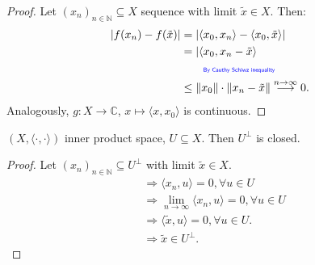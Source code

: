 \documentclass[../../note.tex]{subfiles}
\begin{document}
\begin{example}
\begin{itemize}
        \begin{proof}
            Let $(x_n)_{n \in \mathbb{N}} \subseteq X$ sequence with limit $\tilde{x} \in X$. Then:
            \begin{align}
                \vert f(x_n) -f(\tilde{x}) \vert 
                &= \vert \langle x_0, x_n \rangle - \langle x_0, \tilde{x} \rangle \vert \\
                &= \vert \langle x_0, x_n - \tilde{x} \rangle \\
                &\qquad\text{\color{blue}{\tiny\sffamily By Cauthy Schiwz inequality}} \nonumber \\
                &\leq \Vert x_0 \Vert \cdot \Vert x_n - \tilde{x} \Vert \stackrel{n \rightarrow \infty}{\longrightarrow} 0.
            \end{align}
            Analogously, $g: X \rightarrow \mathbb{C}$, $x \mapsto \langle x, x_0 \rangle$ is continuous.
        \end{proof}
    \end{itemize}
\end{example}

\begin{lemma}
    $(X, \langle \cdot, \cdot \rangle)$ inner product space, $U \subseteq X$. Then $U^\bot$ is closed.
\end{lemma}
\begin{proof}
    Let $(x_n)_{n \in \mathbb{N}} \subseteq U^\bot$ with limit $\tilde{x} \in X$. 
    \begin{align}
        &\Longrightarrow \langle x_n,u \rangle = 0, \forall u \in U \\
        &\Longrightarrow \lim_{n \rightarrow \infty} \langle x_n, u \rangle = 0, \forall u \in U \\
        &\Longrightarrow \langle \tilde{x}, u \rangle = 0, \forall u \in U. \\
        &\Longrightarrow \tilde{x} \in U^\bot.
    \end{align}
\end{proof}
\end{document}
